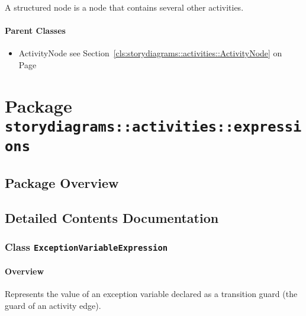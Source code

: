 	
			
A structured node is a node that contains several other activities.	
		
	



\paragraph{Parent Classes}
\begin{itemize}
\item ActivityNode see Section~\ref{cls:storydiagrams::activities::ActivityNode} on Page~\pageref{cls:storydiagrams::activities::ActivityNode}\end{itemize}
\newpage
		


\section{Package \bfseries \texttt{storydiagrams::activities::expressions}\normalfont}
\subsection{Package Overview}

		



\subsection{Detailed Contents Documentation}
\subsubsection{\Large{Class \bfseries \texttt{ExceptionVariableExpression}\normalfont}}
\label{cls:storydiagrams::activities::expressions::ExceptionVariableExpression} 
\paragraph{Overview}

	
			
Represents the value of an exception variable declared as a transition guard (the guard of an activity edge).	
		
	



